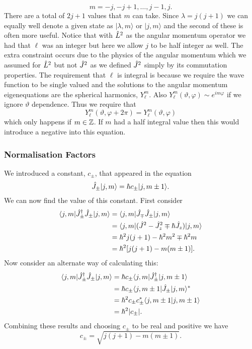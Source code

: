 \documentclass[a4paper]{article}
\renewcommand{\ket}[1]{\vert {#1} \rangle}
\renewcommand{\bra}[1]{\langle {#1} \vert}
\renewcommand{\braket}[2]{\langle {#1} \vert {#2} \rangle}
\theoremstyle{definition}
\begin{document}
    \[m = -j, -j + 1, \dotsc, j - 1, j.\]
    There are a total of \(2j + 1\) values that \(m\) can take.
    Since \(\lambda = j(j + 1)\) we can equally well denote a given state as \(\ket{\lambda, m}\) or \(\ket{j, m}\) and the second of these is often more useful.
    Notice that with \(\hat{L}^2\) as the angular momentum operator we had that \(\ell\) was an integer but here we allow \(j\) to be half integer as well.
    The extra constraint occurs due to the physics of the angular momentum which we assumed for \(\hat{L}^2\) but not \(\hat{J}^2\) as we defined \(\hat{J}^2\) simply by its commutation properties.
    The requirement that \(\ell\) is integral is because we require the wave function to be single valued and the solutions to the angular momentum eigenequations are the spherical harmonics, \(Y_\ell^m\).
    Also \(Y_\ell^m(\vartheta, \varphi) \sim e^{im\varphi}\) if we ignore \(\vartheta\) dependence.
    Thus we require that
    \[Y_\ell^m(\vartheta, \varphi + 2\pi) = Y_\ell^m(\vartheta, \varphi)\]
    which only happens if \(m\in\mathbb{Z}\).
    If \(m\) had a half integral value then this would introduce a negative into this equation.
    
    \subsubsection{Normalisation Factors}
    We introduced a constant, \(c_{\pm}\), that appeared in the equation
    \[\operator{J}_{\pm}\ket{j, m} = \hbar c_{\pm}\ket{j, m \pm 1}.\]
    We can now find the value of this constant.
    First consider
    \begin{align*}
        \bra{j, m}\operator{J}_{\pm}\hermit\operator{J}_{\pm}\ket{j, m} &= \bra{j, m}\operator{J}_{\mp}\operator{J}_{\pm}\ket{j, m}\\
        &= \bra{j, m}(\operator{J}^2 - \operator{J}_z^2 \mp \hbar\operator{J}_z)\ket{j, m}\\
        &= \hbar^2j(j + 1) - \hbar^2m^2 \mp \hbar^2m\\
        &= \hbar^2[j(j+1) - m(m\pm 1)].
    \end{align*}
    Now consider an alternate way of calculating this:
    \begin{align*}
        \bra{j, m}\operator{J}_{\pm}\hermit\operator{J}_{\pm}\ket{j, m} &= \hbar c_{\pm}\bra{j, m}\operator{J}_{\pm}\hermit\ket{j, m \pm 1}\\
        &= \hbar c_{\pm}\bra{j, m\pm 1}\operator{J}_{\pm}\ket{j, m}^*\\
        &= \hbar^2 c_{\pm}c_{\pm}^*\braket{j, m\pm 1}{j, m\pm 1}\\
        &= \hbar^2\abs{c_{\pm}}.
    \end{align*}
    Combining these results and choosing \(c_{\pm}\) to be real and positive we have
    \[c_{\pm} = \sqrt{j(j + 1) - m(m \pm 1)}.\]
    
\end{document}

